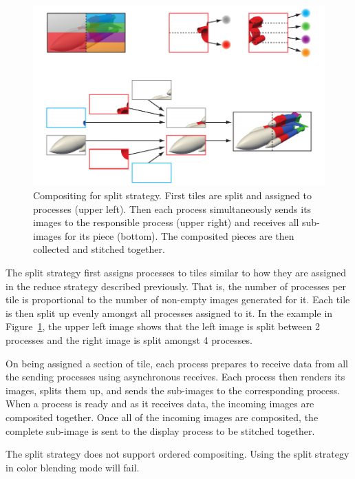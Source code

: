 \begin{figure}
  \centering
  \includegraphics{images/TileSplit}
  \caption[Split strategy composite network.]{Compositing for split
    strategy.  First tiles are split and assigned to processes (upper
    left).  Then each process simultaneously sends its images to the
    responsible process (upper right) and receives all sub-images for its
    piece (bottom).  The composited pieces are then collected and stitched
    together.}
  \label{fig:TileSplit}
\end{figure}

The split strategy first assigns processes to tiles similar to how they are
assigned in the reduce strategy described previously.  That is, the number
of processes per tile is proportional to the number of non-empty images
generated for it.  Each tile is then split up evenly amongst all processes
assigned to it.  In the example in Figure~\ref{fig:TileSplit}, the upper
left image shows that the left image is split between 2 processes and the
right image is split amongst 4 processes.

On being assigned a section of tile, each process prepares to receive data
from all the sending processes using asynchronous receives.  Each process
then renders its images, splits them up, and sends the sub-images to the
corresponding process.  When a process is ready and as it receives data,
the incoming images are composited together.  Once all of the incoming
images are composited, the complete sub-image is sent to the display process
to be stitched together.

The split strategy does not support ordered compositing.  Using the split
strategy in color blending mode will fail.


